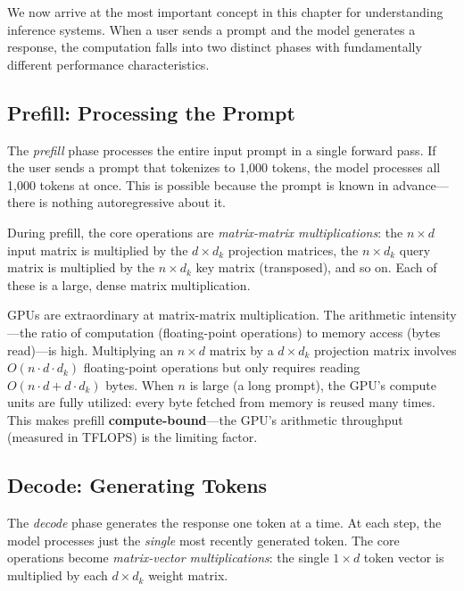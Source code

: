 We now arrive at the most important concept in this chapter for understanding inference systems. When a user sends a prompt and the model generates a response, the computation falls into two distinct phases with fundamentally different performance characteristics.

\subsection{Prefill: Processing the Prompt}
\label{sec:prefill}

%
The \emph{prefill} phase processes the entire input prompt in a single forward pass. If the user sends a prompt that tokenizes to 1,000 tokens, the model processes all 1,000 tokens at once. This is possible because the prompt is known in advance---there is nothing autoregressive about it.

During prefill, the core operations are \emph{matrix-matrix multiplications}: the $n \times d$ input matrix is multiplied by the $d \times d_k$ projection matrices, the $n \times d_k$ query matrix is multiplied by the $n \times d_k$ key matrix (transposed), and so on. Each of these is a large, dense matrix multiplication.

GPUs are extraordinary at matrix-matrix multiplication. The arithmetic intensity---the ratio of computation (floating-point operations) to memory access (bytes read)---is high. Multiplying an $n \times d$ matrix by a $d \times d_k$ projection matrix involves $O(n \cdot d \cdot d_k)$ floating-point operations but only requires reading $O(n \cdot d + d \cdot d_k)$ bytes. When $n$ is large (a long prompt), the GPU's compute units are fully utilized: every byte fetched from memory is reused many times. This makes prefill \textbf{compute-bound}---the GPU's arithmetic throughput (measured in TFLOPS) is the limiting factor.

\subsection{Decode: Generating Tokens}
\label{sec:decode}

%
The \emph{decode} phase generates the response one token at a time. At each step, the model processes just the \emph{single} most recently generated token. The core operations become \emph{matrix-vector multiplications}: the single $1 \times d$ token vector is multiplied by each $d \times d_k$ weight matrix.

